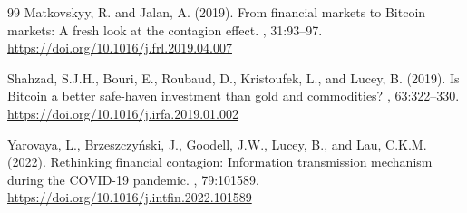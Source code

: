 \documentclass[11pt,a4paper]{article}
\begin{document}
\begin{thebibliography}{99}
Matkovskyy, R. and Jalan, A. (2019).
\newblock From financial markets to Bitcoin markets: A fresh look at the contagion effect.
, 31:93--97.
\newblock \url{https://doi.org/10.1016/j.frl.2019.04.007}

Shahzad, S.J.H., Bouri, E., Roubaud, D., Kristoufek, L., and Lucey, B. (2019).
\newblock Is Bitcoin a better safe-haven investment than gold and commodities?
, 63:322--330.
\newblock \url{https://doi.org/10.1016/j.irfa.2019.01.002}

Yarovaya, L., Brzeszczy\'nski, J., Goodell, J.W., Lucey, B., and Lau, C.K.M. (2022).
\newblock Rethinking financial contagion: Information transmission mechanism during the COVID-19 pandemic.
, 79:101589.
\newblock \url{https://doi.org/10.1016/j.intfin.2022.101589}

\end{thebibliography}
\end{document}
